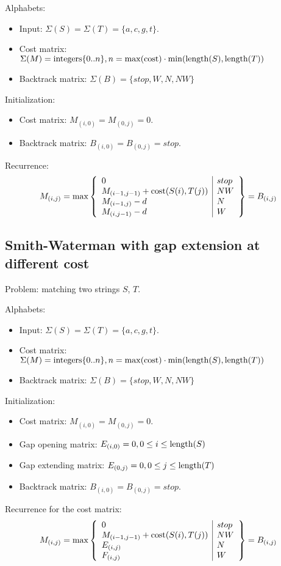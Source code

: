 \documentclass[11pt]{article}
\def\ul{\begin{itemize}}
\def\ule{\end{itemize}}
\begin{document}
Alphabets:\ul
\item Input: $\Sigma(S)=\Sigma(T)=\{a,c,g,t\}$.
\item Cost matrix: $\Sigma(M) = {\rm integers} \{0..n\}, n=\max({\rm cost}) \cdot \min({\rm length}(S),{\rm length}(T))$
\item Backtrack matrix: $\Sigma(B)=\{stop,W,N,NW\}$
\ule

Initialization:\ul
\item Cost matrix: $M_{(i,0)}=M_{(0,j)}=0$.
\item Backtrack matrix: $B_{(i,0)}=B_{(0,j)}=stop$.
\ule

Recurrence:
\[M_{(i,j)}=\max\left\{\begin{array}{l|l}
	0 & stop\\
	M_{(i-1,j-1)}+{\rm cost}(S(i),T(j)) & NW\\
	M_{(i-1,j)}-d & N\\
	M_{(i,j-1)}-d & W
\end{array}\right\}=B_{(i,j)} \]

\subsection{Smith-Waterman with gap extension at different cost}
Problem: matching two strings $S$, $T$.

Alphabets:\ul
\item Input: $\Sigma(S)=\Sigma(T)=\{a,c,g,t\}$.
\item Cost matrix: $\Sigma(M) = {\rm integers} \{0..n\}, n=\max({\rm cost}) \cdot \min({\rm length}(S),{\rm length}(T))$
\item Backtrack matrix: $\Sigma(B)=\{stop,W,N,NW\}$
\ule

Initialization:\ul
\item Cost matrix: $M_{(i,0)}=M_{(0,j)}=0$.
\item Gap opening matrix: $E_{(i,0)}= 0, 0 \le i \le {\rm length}(S)$
\item Gap extending matrix: $E_{(0,j)}= 0, 0 \le j \le {\rm length}(T)$
\item Backtrack matrix: $B_{(i,0)}=B_{(0,j)}=stop$.
\ule

Recurrence for the cost matrix:
\[M_{(i,j)}=\max\left\{\begin{array}{l|l}
	0 & stop\\
	M_{(i-1,j-1)}+{\rm cost}(S(i),T(j)) & NW\\
	E_{(i,j)} & N\\
	F_{(i,j)} & W
\end{array}\right\}=B_{(i,j)} \]
\end{document}
